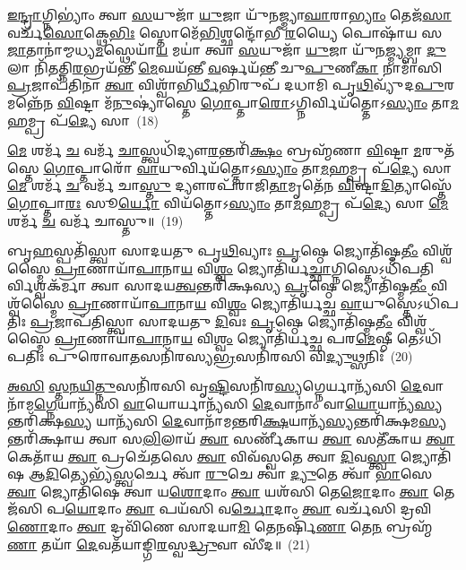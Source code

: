 \-\ul{𑌇}\-\-\ul{𑌨𑍍𑌦𑍍𑌰𑌾}\-𑌗𑍍𑌨𑌿\-𑌭𑍍𑌯𑌾𑌂॑ 𑌤𑍍𑌵𑌾 \ul{𑌸}\-𑌯𑍁𑌜𑌾᳴ \ul{𑌯𑍁}\-𑌜𑌾 𑌯𑍁᳴𑌨𑌜𑍍𑌮𑍍𑌯𑌾\-\ul{𑌘𑌾}\-𑌰𑌾\-\ul{𑌭𑍍𑌯𑌾𑌂} 𑌤𑍇𑌜᳴\-\ul{𑌸𑌾} 𑌵𑌰𑍍𑌚᳴\-\ul{𑌸𑍋}\-𑌕𑍍𑌥𑍇\-\ul{𑌭𑌿𑌃} 𑌸𑍍𑌤𑍋𑌮𑍇᳴\-\ul{𑌭𑌿}\-𑌶𑍍𑌛𑌨𑍍𑌦𑍋᳴𑌭𑍀 \ul{𑌰}\-𑌯𑍍𑌯𑍈 𑌪𑍋𑌷𑌾᳴𑌯 𑌸\-\ul{𑌜𑌾}\-𑌤𑌾𑌨𑌾॑𑌮𑍍𑌮𑌧𑍍𑌯\-\ul{𑌮}\-𑌸𑍍𑌥𑍇𑌯𑌾᳴\-\ul{𑌯} 𑌮𑌯𑌾॑ 𑌤𑍍𑌵𑌾 \ul{𑌸}\-𑌯𑍁𑌜𑌾᳴ \ul{𑌯𑍁}\-𑌜𑌾 𑌯𑍁᳴𑌨\-\ul{𑌜𑍍𑌮𑍍𑌯}\-𑌮𑍍𑌬𑌾 \ul{𑌦𑍁}\-𑌲𑌾 𑌨𑌿᳴\-\ul{𑌤}\-𑌤𑍍𑌨𑌿\-\ul{𑌰}\-𑌭𑍍𑌰𑌯᳴𑌨𑍍𑌤𑍀 \ul{𑌮𑍇}\-𑌘𑌯᳴𑌨𑍍𑌤𑍀 \ul{𑌵}\-𑌰𑍍\mbox{}𑌷𑌯᳴𑌨𑍍𑌤𑍀 𑌚𑍁\-\ul{𑌪𑍁}\-𑌣𑍀\-\ul{𑌕𑌾} 𑌨𑌾𑌮𑌾᳴𑌸𑌿 \ul{𑌪𑍍𑌰}\-𑌜𑌾𑌪᳴𑌤𑌿𑌨𑌾 \ul{𑌤𑍍𑌵𑌾} 𑌵𑌿𑌶𑍍𑌵𑌾᳴𑌭𑌿\-\ul{𑌰𑍍𑌧𑍀}\-𑌭𑌿𑌰𑍁𑌪᳴ 𑌦𑌧𑌾𑌮𑌿 𑌪𑍃\-\ul{𑌥𑌿}\-𑌵𑍍𑌯𑍁᳴𑌦\-\ul{𑌪𑍁}\-𑌰𑌮𑌨𑍍𑌨𑍇᳴𑌨 \ul{𑌵𑌿}\-𑌷𑍍𑌟𑌾 𑌮᳴\-\ul{𑌨𑍁}\-𑌷𑍍𑌯𑌾॑𑌸𑍍𑌤𑍇 \ul{𑌗𑍋}\-𑌪𑍍𑌤𑌾\-\ul{𑌰𑍋}\-\-𑌽𑌗𑍍𑌨𑌿𑌰𑍍𑌵𑌿𑌯᳴𑌤𑍍𑌤𑍋\-𑌽\-\ul{𑌸𑍍𑌯𑌾𑌂} 𑌤𑌾\-\ul{𑌮}\-𑌹𑌮𑍍𑌪𑍍𑌰 𑌪᳴\-\ul{𑌦𑍍𑌯𑍇} 𑌸𑌾~(18)

\-\ul{𑌮𑍇} 𑌶𑌰𑍍𑌮᳴ \ul{𑌚} 𑌵𑌰𑍍𑌮᳴ \ul{𑌚𑌾}\-𑌸𑍍𑌤𑍍𑌵𑌧𑌿᳴𑌦𑍍𑌯𑍗\-\ul{𑌰}\-𑌨𑍍𑌤𑌰𑌿᳴\-\ul{𑌕𑍍𑌷𑌂} 𑌬𑍍𑌰𑌹𑍍𑌮᳴𑌣𑌾 \ul{𑌵𑌿}\-𑌷𑍍𑌟𑌾 \ul{𑌮}\-𑌰𑍁𑌤᳴𑌸𑍍𑌤𑍇 \ul{𑌗𑍋}\-𑌪𑍍𑌤𑌾𑌰𑍋᳴ \ul{𑌵𑌾}\-𑌯𑍁𑌰𑍍𑌵𑌿𑌯᳴𑌤𑍍𑌤𑍋\-𑌽\-\ul{𑌸𑍍𑌯𑌾𑌂} 𑌤𑌾\-\ul{𑌮}\-𑌹𑌮𑍍𑌪𑍍𑌰 𑌪᳴\-\ul{𑌦𑍍𑌯𑍇} 𑌸𑌾 \ul{𑌮𑍇} 𑌶𑌰𑍍𑌮᳴ \ul{𑌚} 𑌵𑌰𑍍𑌮᳴ 𑌚𑌾\-\ul{𑌸𑍍𑌤𑍁} 𑌦𑍍𑌯𑍗𑌰𑌪᳴𑌰𑌾𑌜𑌿\-\ul{𑌤𑌾}\-𑌮𑍃𑌤𑍇᳴𑌨 \ul{𑌵𑌿}\-𑌷𑍍𑌟𑌾\-\ul{𑌦𑌿}\-𑌤𑍍𑌯𑌾𑌸𑍍𑌤𑍇᳴ \ul{𑌗𑍋}\-𑌪𑍍𑌤𑌾\-\ul{𑌰𑌃} 𑌸𑍂\-\ul{𑌰𑍍𑌯𑍋} 𑌵𑌿𑌯᳴𑌤𑍍𑌤𑍋\-𑌽\-\ul{𑌸𑍍𑌯𑌾𑌂} 𑌤𑌾\-\ul{𑌮}\-𑌹𑌮𑍍𑌪𑍍𑌰 𑌪᳴\-\ul{𑌦𑍍𑌯𑍇} 𑌸𑌾 \ul{𑌮𑍇} 𑌶𑌰𑍍𑌮᳴ \ul{𑌚} 𑌵𑌰𑍍𑌮᳴ 𑌚𑌾𑌸𑍍𑌤𑍁॥~(19)

{\anuvakamend[{𑌸𑌾\-𑌽𑌷𑍍𑌟𑌾𑌚᳴𑌤𑍍𑌵𑌾𑌰𑌿𑍞𑌶𑌚𑍍𑌚}]}%

𑌬𑍃\-\ul{𑌹}\-𑌸𑍍𑌪𑌤𑌿᳴𑌸𑍍𑌤𑍍𑌵𑌾 𑌸𑌾𑌦𑌯𑌤𑍁 𑌪𑍃\-\ul{𑌥𑌿}\-𑌵𑍍𑌯𑌾𑌃 \ul{𑌪𑍃}\-𑌷𑍍𑌠𑍇 𑌜𑍍𑌯𑍋𑌤𑌿᳴𑌷𑍍𑌮\-\ul{𑌤𑍀𑌂} 𑌵𑌿𑌶𑍍𑌵᳴𑌸𑍍𑌮𑍈 \ul{𑌪𑍍𑌰𑌾}\-𑌣𑌾𑌯𑌾᳴\-\ul{𑌪𑌾}\-𑌨𑌾\-\ul{𑌯} 𑌵𑌿\-\ul{𑌶𑍍𑌵𑌂} 𑌜𑍍𑌯𑍋𑌤𑌿᳴𑌰𑍍𑌯\-\ul{𑌚𑍍𑌛𑌾}\-𑌗𑍍𑌨𑌿𑌸𑍍𑌤𑍇\-𑌽𑌧𑌿᳴𑌪𑌤𑌿𑌰𑍍\-\-\ul{𑌵𑌿}\-𑌶𑍍𑌵𑌕᳴𑌰𑍍𑌮𑌾 𑌤𑍍𑌵𑌾 𑌸𑌾𑌦𑌯\-\ul{𑌤𑍍𑌵}\-𑌨𑍍𑌤𑌰𑌿᳴𑌕𑍍𑌷𑌸𑍍𑌯 \ul{𑌪𑍃}\-𑌷𑍍𑌠𑍇 𑌜𑍍𑌯𑍋𑌤𑌿᳴𑌷𑍍𑌮\-\ul{𑌤𑍀𑌂} 𑌵𑌿𑌶𑍍𑌵᳴𑌸𑍍𑌮𑍈 \ul{𑌪𑍍𑌰𑌾}\-𑌣𑌾𑌯𑌾᳴\-\ul{𑌪𑌾}\-𑌨𑌾\-\ul{𑌯} 𑌵𑌿\-\ul{𑌶𑍍𑌵𑌂} 𑌜𑍍𑌯𑍋𑌤𑌿᳴𑌰𑍍𑌯𑌚𑍍𑌛 \ul{𑌵𑌾}\-𑌯𑍁𑌸𑍍𑌤𑍇\-𑌽𑌧𑌿᳴𑌪𑌤𑌿𑌃 \ul{𑌪𑍍𑌰}\-𑌜𑌾𑌪᳴𑌤𑌿𑌸𑍍𑌤𑍍𑌵𑌾 𑌸𑌾𑌦𑌯𑌤𑍁 \ul{𑌦𑌿}\-𑌵𑌃 \ul{𑌪𑍃}\-𑌷𑍍𑌠𑍇 𑌜𑍍𑌯𑍋𑌤𑌿᳴𑌷𑍍𑌮\-\ul{𑌤𑍀𑌂} 𑌵𑌿𑌶𑍍𑌵᳴𑌸𑍍𑌮𑍈 \ul{𑌪𑍍𑌰𑌾}\-𑌣𑌾𑌯𑌾᳴\-\ul{𑌪𑌾}\-𑌨𑌾\-\ul{𑌯} 𑌵𑌿\-\ul{𑌶𑍍𑌵𑌂} 𑌜𑍍𑌯𑍋𑌤𑌿᳴𑌰𑍍𑌯𑌚𑍍𑌛 𑌪𑌰\-\ul{𑌮𑍇}\-𑌷𑍍𑌠𑍀 𑌤𑍇\-𑌽𑌧𑌿᳴𑌪𑌤𑌿𑌃 𑌪𑍁𑌰𑍋𑌵𑌾\-\ul{𑌤}\-𑌸𑌨𑌿᳴𑌰𑌸𑍍𑌯\-\ul{𑌭𑍍𑌰}\-𑌸𑌨𑌿᳴𑌰𑌸𑌿 𑌵𑌿\-\ul{𑌦𑍍𑌯𑍁}\-𑌥𑍍𑌸𑌨𑌿𑌃᳴~(20)

\-\ul{𑌅}\-\-\ul{𑌸𑌿} \ul{𑌸𑍍𑌤}\-\-\ul{𑌨}\-\-\ul{𑌯𑌿}\-\-\ul{𑌤𑍍𑌨𑍁}\-𑌸𑌨𑌿᳴𑌰𑌸𑌿 𑌵𑍃\-\ul{𑌷𑍍𑌟𑌿}\-𑌸𑌨𑌿᳴𑌰\-\ul{𑌸𑍍𑌯}\-𑌗𑍍𑌨𑍇𑌰𑍍𑌯𑌾𑌨𑍍𑌯᳴𑌸𑌿 \ul{𑌦𑍇}\-𑌵𑌾𑌨𑌾᳴𑌮\-\ul{𑌗𑍍𑌨𑍇}\-𑌯𑌾𑌨𑍍𑌯᳴𑌸𑌿 \ul{𑌵𑌾}\-𑌯𑍋𑌰𑍍𑌯𑌾𑌨𑍍𑌯᳴𑌸𑌿 \ul{𑌦𑍇}\-𑌵𑌾𑌨𑌾𑌂॑ 𑌵𑌾\-\ul{𑌯𑍋}\-𑌯𑌾𑌨𑍍𑌯᳴\-\ul{𑌸𑍍𑌯}\-𑌨𑍍𑌤𑌰𑌿᳴𑌕𑍍𑌷\-\ul{𑌸𑍍𑌯} 𑌯𑌾𑌨𑍍𑌯᳴𑌸𑌿 \ul{𑌦𑍇}\-𑌵𑌾𑌨𑌾᳴𑌮𑌨𑍍𑌤𑌰𑌿\-\ul{𑌕𑍍𑌷}\-𑌯𑌾𑌨𑍍𑌯᳴\-\ul{𑌸𑍍𑌯}\-𑌨𑍍𑌤𑌰𑌿᳴𑌕𑍍𑌷𑌮\-\ul{𑌸𑍍𑌯}\-𑌨𑍍𑌤𑌰𑌿᳴𑌕𑍍𑌷𑌾𑌯 𑌤𑍍𑌵𑌾 𑌸\-\ul{𑌲𑌿}\-𑌲𑌾𑌯᳴ \ul{𑌤𑍍𑌵𑌾} 𑌸𑌰𑍍𑌣𑍀᳴𑌕𑌾𑌯 \ul{𑌤𑍍𑌵𑌾} 𑌸𑌤𑍀᳴𑌕𑌾𑌯 \ul{𑌤𑍍𑌵𑌾} 𑌕𑍇𑌤𑌾᳴𑌯 \ul{𑌤𑍍𑌵𑌾} 𑌪𑍍𑌰𑌚𑍇᳴𑌤𑌸𑍇 \ul{𑌤𑍍𑌵𑌾} 𑌵𑌿𑌵᳴𑌸𑍍𑌵𑌤𑍇 𑌤𑍍𑌵𑌾 \ul{𑌦𑌿}\-𑌵\-\ul{𑌸𑍍𑌤𑍍𑌵𑌾} 𑌜𑍍𑌯𑍋𑌤𑌿᳴𑌷 𑌆\-\ul{𑌦𑌿}\-𑌤𑍍𑌯𑍇𑌭𑍍𑌯᳴\-\ul{𑌸𑍍𑌤𑍍𑌵}\-𑌰𑍍𑌚𑍇 𑌤𑍍𑌵𑌾᳴ \ul{𑌰𑍁}\-𑌚𑍇 𑌤𑍍𑌵𑌾॑ \ul{𑌦𑍍𑌯𑍁}\-𑌤𑍇 𑌤𑍍𑌵𑌾᳴ \ul{𑌭𑌾}\-𑌸𑍇 \ul{𑌤𑍍𑌵𑌾} 𑌜𑍍𑌯𑍋𑌤𑌿᳴𑌷𑍇 𑌤𑍍𑌵𑌾 𑌯\-\ul{𑌶𑍋}\-𑌦𑌾𑌂 \ul{𑌤𑍍𑌵𑌾} 𑌯𑌶᳴𑌸𑌿 𑌤𑍇\-\ul{𑌜𑍋}\-𑌦𑌾𑌂 \ul{𑌤𑍍𑌵𑌾} 𑌤𑍇𑌜᳴𑌸𑌿 𑌪\-\ul{𑌯𑍋}\-𑌦𑌾𑌂 \ul{𑌤𑍍𑌵𑌾} 𑌪𑌯᳴𑌸𑌿 𑌵\-\ul{𑌰𑍍𑌚𑍋}\-𑌦𑌾𑌂 \ul{𑌤𑍍𑌵𑌾} 𑌵𑌰𑍍𑌚᳴𑌸𑌿 𑌦𑍍𑌰𑌵𑌿\-\ul{𑌣𑍋}\-𑌦𑌾𑌂 \ul{𑌤𑍍𑌵𑌾} 𑌦𑍍𑌰𑌵𑌿᳴𑌣𑍇 𑌸𑌾𑌦𑌯𑌾\-\ul{𑌮𑌿} 𑌤𑍇𑌨𑌰𑍍\mbox{}𑌷𑌿᳴\-\ul{𑌣𑌾} 𑌤𑍇\-\ul{𑌨} 𑌬𑍍𑌰𑌹𑍍𑌮᳴\-\ul{𑌣𑌾} 𑌤𑌯𑌾᳴ \ul{𑌦𑍇}\-𑌵𑌤᳴𑌯𑌾𑌙𑍍𑌗𑌿\-\ul{𑌰}\-𑌸𑍍𑌵\-\ul{𑌦𑍍𑌧𑍍𑌰𑍁}\-𑌵𑌾 𑌸𑍀᳴𑌦॥~(21)

